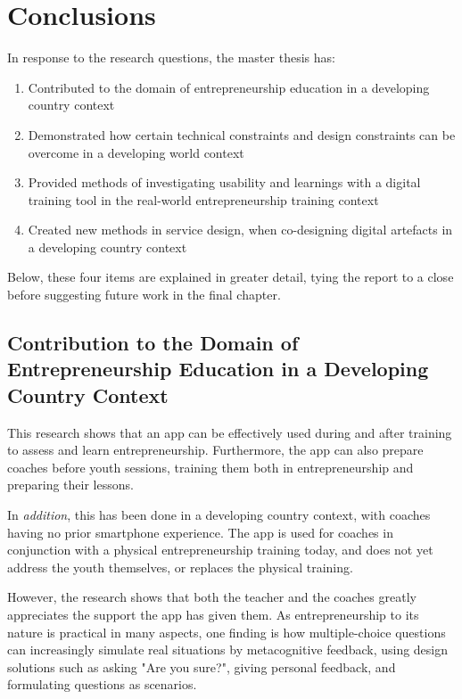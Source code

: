 \chapter{Conclusions}\label{cha:conclusion}


In response to the research questions, the master thesis has: %

\begin{enumerate}
\item Contributed to the domain of entrepreneurship education in a developing country context
\item Demonstrated how certain technical constraints and design constraints can be overcome in a developing world context
\item Provided methods of investigating usability and learnings with a digital training tool in the real-world entrepreneurship training context
\item Created new methods in service design, when co-designing digital artefacts in a developing country context
\end{enumerate}

Below, these four items are explained in greater detail, tying the report to a close before suggesting future work in the final chapter.

\section{Contribution to the Domain of Entrepreneurship Education in a Developing Country Context}
This research shows that an app can be effectively used during and after training to assess and learn entrepreneurship. Furthermore, the app can also prepare coaches before youth sessions, training them both in entrepreneurship and preparing their lessons.

In \textit{addition}, this has been done in a developing country context, with coaches having no prior smartphone experience. The app is used for coaches in conjunction with a physical entrepreneurship training today, and does not yet address the youth themselves, or replaces the physical training.

However, the research shows that both the teacher and the coaches greatly appreciates the support the app has given them. As entrepreneurship to its nature is practical in many aspects, one finding is how multiple-choice questions can increasingly simulate real situations by metacognitive feedback, using design solutions such as asking "Are you sure?", giving personal feedback, and formulating questions as scenarios.

